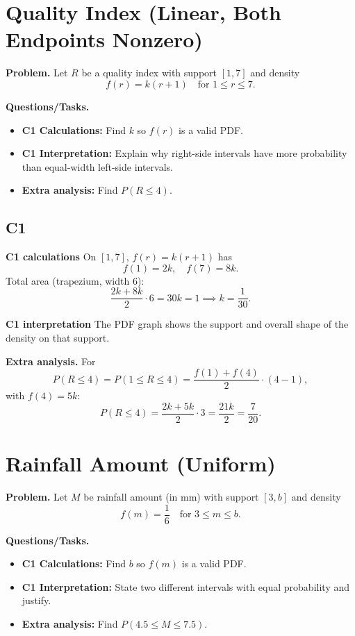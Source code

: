	\section{Quality Index (Linear, Both Endpoints Nonzero)}
	
	\textbf{Problem.}
	Let $R$ be a quality index with support $[1,7]$ and density
	\[
	f(r)=k(r+1)\quad\text{for }1\le r\le 7.
	\]
	
	\textbf{Questions/Tasks.}
	\begin{itemize}
		\item \textbf{C1 Calculations:} Find $k$ so $f(r)$ is a valid PDF.
		\item \textbf{C1 Interpretation:} Explain why right-side intervals have more probability than equal-width left-side intervals.
		\item \textbf{Extra analysis:} Find $P(R\le 4)$.
	\end{itemize}

	\subsection*{C1}

\textbf{C1 calculations}
On $[1,7]$, $f(r)=k(r+1)$ has
	\[
	f(1)=2k,\quad f(7)=8k.
	\]
	Total area (trapezium, width $6$):
	\[
	\frac{2k+8k}{2}\cdot6=30k=1\implies k=\frac1{30}.
	\]

\textbf{C1 interpretation}
The PDF graph shows the support and overall shape of the density on that support.

\textbf{Extra analysis.}
For
\[
P(R\le4)=P(1\le R\le4)=\frac{f(1)+f(4)}{2}\cdot(4-1),
\]
with $f(4)=5k$:
\[
P(R\le4)=\frac{2k+5k}{2}\cdot3=\frac{21k}{2}=\frac7{20}.
\]

	
	\section{Rainfall Amount (Uniform)}
	
	\textbf{Problem.}
	Let $M$ be rainfall amount (in mm) with support $[3,b]$ and density
	\[
	f(m)=\frac16\quad\text{for }3\le m\le b.
	\]
	
	\textbf{Questions/Tasks.}
	\begin{itemize}
		\item \textbf{C1 Calculations:} Find $b$ so $f(m)$ is a valid PDF.
		\item \textbf{C1 Interpretation:} State two different intervals with equal probability and justify.
		\item \textbf{Extra analysis:} Find $P(4.5\le M\le 7.5)$.
	\end{itemize}
	
